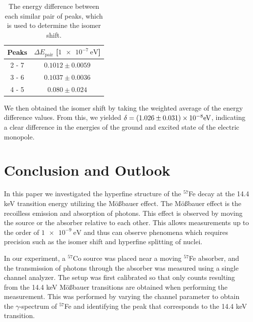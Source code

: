 \documentclass[a4paper]{report}
\numberwithin{equation}{section}
\begin{document}
\begin{table}[!ht]
    \centering
    \begin{tabular}{|c|c|}
    \hline
        Peaks & $\Delta E_\mathrm{pair}$ [$\SI{1e-7}{\electronvolt}$] \\ \hline
        2 - 7 & $0.1012 \pm 0.0059$ \\ \hline
        3 - 6 & $0.1037 \pm 0.0036$ \\ \hline
        4 - 5 & $0.080 \pm 0.024$ \\ \hline
    \end{tabular}
    \caption{The energy difference between each similar pair of peaks, which is used to determine the isomer shift.}
    \label{tab:isomer_en}
\end{table}

We then obtained the isomer shift by taking the weighted average of the energy difference values. From this, we yielded
$\delta = \num[scientific-notation=true]{0.1026(31)e-7}\si[]{\electronvolt}$, indicating a clear difference in the 
energies of the ground and excited state of the electric monopole. \par 

\chapter{Conclusion and Outlook}

In this paper we investigated the hyperfine structure of the $^{57}$Fe decay
 at the 14.4 keV transition energy utilizing the M\"o{\ss}bauer effect. The M\"o{\ss}bauer effect
 is the recoilless emission and absorption of photons. This effect is observed by moving the source or the absorber
 relative to each other. This allows measurements 
 up to the order of $\SI{1e-9}{\electronvolt}$ and thus can observe phenomena which requires 
 precision such as the isomer shift and hyperfine splitting of nuclei. \par
 
 In our experiment, a $^{57}$Co source was placed near a moving $^{57}$Fe absorber, and the transmission 
 of photons through the absorber was measured using a single channel analyzer. The setup was 
 first calibrated so that only counts resulting from the 14.4 keV M\"o{\ss}bauer transitions are obtained when 
 performing the measurement. This was performed by varying the channel parameter to obtain the 
 $\gamma$-spectrum of $^{57}$Fe and identifying the peak that corresponds to the 14.4 keV transition. \par 
\end{document}
